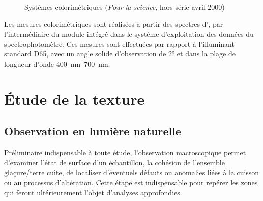 \begin{figure}[htb]
{\begin{minipage}[b]{0.45\textwidth}
  \end{minipage}%
  }%
  \caption[Systèmes colorimétriques \trichros]
          {Systèmes colorimétriques \trichros (\emph{Pour la science}, 
           hors série avril 2000)}
  \label{fig:colorimetrie}
\end{figure}


Les mesures colorimétriques sont réalisées à partir des spectres 
d'\AO, par l'intermédiaire du module  intégré 
dans le système d'exploitation des données du spectrophotomètre. Ces 
mesures sont effectuées par rapport à l'illuminant standard D65, avec 
un angle solide d'observation de \ang{2} et dans la plage de longueur 
d'onde \SIrange{400}{700}{\nm}.

\section{Étude de la texture}

\subsection{Observation en lumière naturelle}
Préliminaire indispensable à toute étude, l'observation macroscopique 
permet d'examiner l'état de surface d'un échantillon, la cohésion de 
l'ensemble glaçure/terre cuite, de localiser d'éventuels défauts ou 
anomalies liées à la cuisson ou au processus d'altération. Cette étape 
est indispensable pour repérer les zones qui feront ultérieurement 
l'objet d'analyses approfondies.

